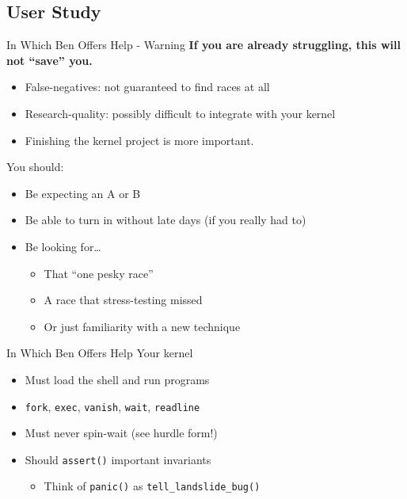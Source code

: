 \documentclass[xcolor=dvipsnames]{beamer}
\begin{document}

\subsection{User Study}

\begin{frame}{In Which Ben Offers Help - Warning}
	\textbf{If you are already struggling, this will not ``save'' you.}
	\begin{itemize}
		\item False-negatives: not guaranteed to find races at all
		\item Research-quality: possibly difficult to integrate with your kernel
		\item Finishing the kernel project is more important.
	\end{itemize}
	You should:
	\begin{itemize}
		\item Be expecting an A or B
		\item Be able to turn in without late days (if you really had to)
		\item Be looking for\ldots
			\begin{itemize}
				\item That ``one pesky race''
				\item A race that stress-testing missed
				\item Or just familiarity with a new technique
			\end{itemize}
	\end{itemize}
\end{frame}

\begin{frame}{In Which Ben Offers Help}
	Your kernel
	\begin{itemize}
		\item Must load the shell and run programs
		\item \texttt{fork},
			\texttt{exec},
			\texttt{vanish},
			\texttt{wait},
			\texttt{readline}
		\item Must never spin-wait (see hurdle form!)
		\item Should \texttt{assert()} important invariants
		\begin{itemize}
			\item Think of \texttt{panic()} as \texttt{tell\_landslide\_bug()}
		\end{itemize}
	\end{itemize}
\end{frame}
\end{document}
